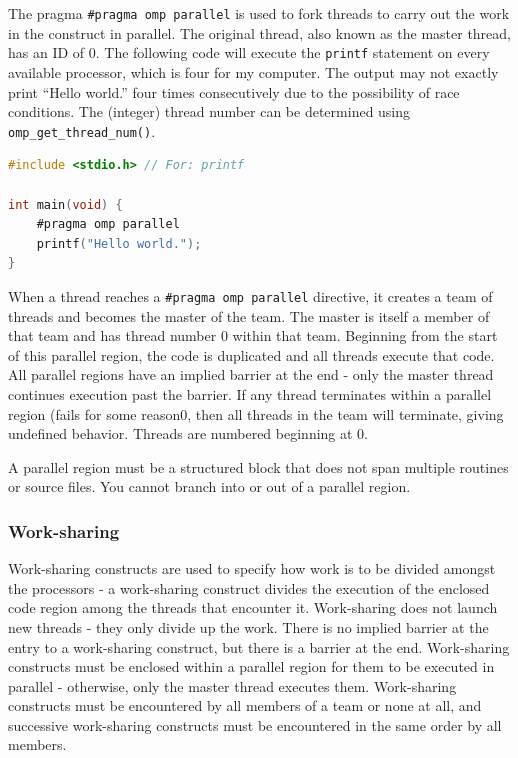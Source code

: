 \documentclass[10pt]{article}
\begin{document}
\begin{flushleft}
The pragma {\tt \#pragma omp parallel} is used to fork threads to carry out the work in the construct in parallel. The original thread, also known as the master thread, has an ID of 0. The following code will execute the {\tt printf} statement on every available processor, which is four for my computer. The output may not exactly print ``Hello world.'' four times consecutively due to the possibility of race conditions. The (integer) thread number can be determined using {\tt omp\_get\_thread\_num()}.

\begin{lstlisting}[language=C, basicstyle=\ttfamily\small]
#include <stdio.h> // For: printf

int main(void) {
	#pragma omp parallel
	printf("Hello world.");
}
\end{lstlisting}

When a thread reaches a {\tt \#pragma omp parallel} directive, it creates a team of threads and becomes the master of the team. The master is itself a member of that team and has thread number 0 within that team. Beginning from the start of this parallel region, the code is duplicated and all threads execute that code. All parallel regions have an implied barrier at the end - only the master thread continues execution past the barrier. If any thread terminates within a parallel region (fails for some reason0, then all threads in the team will terminate, giving undefined behavior. Threads are numbered beginning at 0.

A parallel region must be a structured block that does not span multiple routines or source files. You cannot branch into or out of a parallel region. 

\subsubsection{Work-sharing}

Work-sharing constructs are used to specify how work is to be divided amongst the processors - a work-sharing construct divides the execution of the enclosed code region among the threads that encounter it. Work-sharing does not launch new threads - they only divide up the work. There is no implied barrier at the entry to a work-sharing construct, but there is a barrier at the end. Work-sharing constructs must be enclosed within a parallel region for them to be executed in parallel - otherwise, only the master thread executes them. Work-sharing constructs must be encountered by all members of a team or none at all, and successive work-sharing constructs must be encountered in the same order by all members. 


\end{flushleft}
\end{document}
